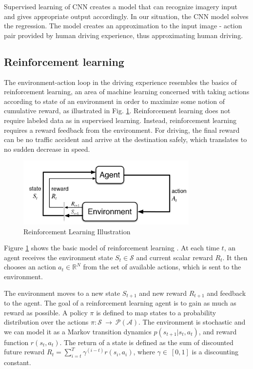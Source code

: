 \documentclass[a4paper]{article}
\begin{document}
Supervised learning of CNN creates a model that can recognize imagery input and gives appropriate output accordingly. In our situation, the CNN model solves the regression. The model creates an approximation to the input image - action pair provided by human driving experience, thus approximating human driving.

\subsection{Reinforcement learning}
The environment-action loop in the driving experience resembles the basics of reinforcement learning, an area of machine learning concerned with taking actions according to state of an environment in order to maximize some notion of cumulative reward, as illustrated in Fig. \ref{fig:RL}. Reinforcement learning does not require labeled data as in supervised learning. Instead, reinforcement learning requires a reward feedback from the environment. For driving, the final reward can be no traffic accident and arrive at the destination safely, which translates to no sudden decrease in speed.

\begin{figure}
    \centering
    \includegraphics[width=0.8\textwidth]{./figures/rl.png}
    \caption{ Reinforcement Learning Illustration \cite{sutton2018reinforcement}}
    \label{fig:RL}
\end{figure}


Figure \ref{fig:RL} shows the basic model of reinforcement learning \cite{sutton2018reinforcement}. At
each time $t$, an agent receives the environment state $S_t \in \mathcal{S}$ and current scalar
reward $R_t$. It then chooses an action $a_t \in \mathbb{R}^N$ from the set of available
actions, which is sent to the environment. 

The environment moves to a new state $S_{t+1}$ and new reward $R_{t+1}$ and feedback to the agent.
The goal of a reinforcement learning agent is to gain as much as reward as possible. A policy
$\pi$ is defined to map states to a probability distribution over the actions $\pi : \mathcal{S}
\ \rightarrow\ \mathcal{P}(\mathcal{A})$. The environment is stochastic and we can model it as
a Markov transition dynamics $p(s_{t+1} | s_t, a_t)$, and reward function $r(s_t, a_t)$.
The return of a state is defined as the sum of discounted future reward $R_t = \sum\limits_{i=t}
^{T}{\gamma^{(i-t)} r(s_i, a_i)}$, where $\gamma \in\ [0,1]$ is a discounting constant. 
\end{document}
